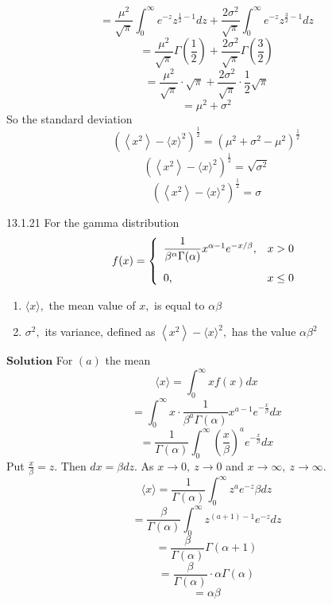 $$=\frac{\mu^{2}}{\sqrt{\pi}} \int_{0}^{\infty} e^{-z} z^{\frac{1}{2}-1} d z+\frac{2 \sigma^{2}}{\sqrt{\pi}} \int_{0}^{\infty} e^{-z} z^{\frac{3}{2}-1} d z$$
$$=\frac{\mu^{2}}{\sqrt{\pi}} \Gamma\left(\frac{1}{2}\right)+\frac{2 \sigma^{2}}{\sqrt{\pi}} \Gamma\left(\frac{3}{2}\right)$$
$$=\frac{\mu^{2}}{\sqrt{\pi}} \cdot \sqrt{\pi}+\frac{2 \sigma^{2}}{\sqrt{\pi}} \cdot \frac{1}{2} \sqrt{\pi}$$
$$=\mu^{2}+\sigma^{2}$$
So the standard deviation 
$$\left(\left\langle x^{2}\right\rangle-\langle x\rangle^{2}\right)^{\frac{1}{2}}=\left(\mu^{2}+\sigma^{2}-\mu^{2}\right)^{\frac{1}{2}}$$
$$\left(\left\langle x^{2}\right\rangle-\langle x\rangle^{2}\right)^{\frac{1}{2}}=\sqrt{\sigma^{2}}$$
$$\left(\left\langle x^{2}\right\rangle-\langle x\rangle^{2}\right)^{\frac{1}{2}}=\sigma$$


\newpage

\begin{mybox}{13.1.21}
For the gamma distribution
$$
f(x)=\left\{\begin{array}{ll}
\dfrac{1}{\beta^{\alpha} \Gamma(\alpha)} x^{\alpha-1} e^{-x / \beta}, & x>0 \vspace{3mm}\\
0, & x \leq 0
\end{array}\right.
$$
\begin{enumerate}[$(a)$]
\item $\langle x\rangle,$ the mean value of $x,$ is equal to $\alpha \beta$
\item $\sigma^{2},$ its variance, defined as $\left\langle x^{2}\right\rangle-\langle x\rangle^{2},$ has the value $\alpha \beta^{2}$
\end{enumerate}
\end{mybox}

$\boxed{\textbf{Solution}}$ For $(a)$ the mean
$$
\langle x\rangle=\int_{0}^{\infty} x f(x) d x
$$
$$=\int_{0}^{\infty} x \cdot \frac{1}{\beta^{a} \Gamma(\alpha)} x^{a-1} e^{-\frac{x}{\beta}} d x$$
$$=\frac{1}{\Gamma(\alpha)} \int_{0}^{\infty}\left(\frac{x}{\beta}\right)^{a} e^{-\frac{x}{\beta}} d x$$
Put $\frac{x}{\beta}=z .$ Then $d x=\beta d z .$ As $x \rightarrow 0, \  z \rightarrow 0$ and $x \rightarrow \infty, \  z \rightarrow \infty$.
$$
\langle x\rangle=\frac{1}{\Gamma(\alpha)} \int_{0}^{\infty} z^{a} e^{-z} \beta d z
$$
$$=\frac{\beta}{\Gamma(\alpha)} \int_{0}^{\infty} z^{(a+1)-1} e^{-z} d z$$
$$=\frac{\beta}{\Gamma(\alpha)} \Gamma(\alpha+1)$$
$$=\frac{\beta}{\Gamma(\alpha)} \cdot \alpha \Gamma(\alpha)$$
$$=\alpha \beta$$

